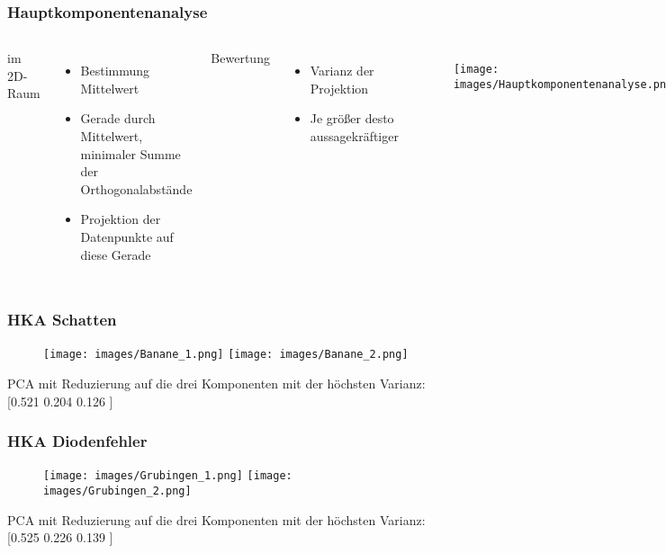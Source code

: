 \documentclass[utf8x, xcolor=dvipsnames]{beamer}
\begin{document}
\begin{frame}
\frametitle{Hauptkomponentenanalyse}
\begin{columns}[c]
	im 2D-Raum
	\begin{itemize}
		\item Bestimmung Mittelwert
		\item Gerade durch Mittelwert, minimaler Summe der Orthogonalabstände
		\item Projektion der Datenpunkte auf diese Gerade
	\end{itemize}
	
	Bewertung
	\begin{itemize}
		\item Varianz der Projektion
		\item Je größer desto aussagekräftiger
	\end{itemize}
	
	\begin{figure}
		\texttt{[image: images/Hauptkomponentenanalyse.png]}
	\end{figure}
\end{columns}
\end{frame}

\begin{frame}
\frametitle{HKA Schatten}
\begin{figure}
	\texttt{[image: images/Banane\_1.png]}
	\texttt{[image: images/Banane\_2.png]}
\end{figure}

PCA mit Reduzierung auf die drei Komponenten mit der höchsten Varianz: [0.521  0.204 0.126 ] 

\end{frame}

\begin{frame}
\frametitle{HKA Diodenfehler}
\begin{figure}
	\texttt{[image: images/Grubingen\_1.png]}
	\texttt{[image: images/Grubingen\_2.png]}
\end{figure}

PCA mit Reduzierung auf die drei Komponenten mit der höchsten Varianz: [0.525  0.226 0.139 ]
\end{frame}
\end{document}
